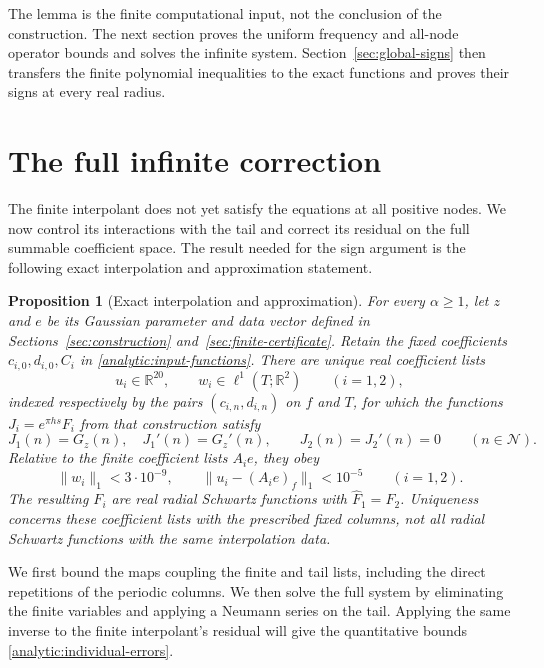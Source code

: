 \documentclass[11pt]{article}
\newtheorem{proposition}[theorem]{Proposition}
\theoremstyle{remark}\newtheorem{remark}[theorem]{Remark}
\begin{document}
The lemma is the finite computational input, not the conclusion of the
construction. The next section proves the uniform frequency and all-node
operator bounds and solves the infinite system. Section~\ref{sec:global-signs}
then transfers the finite polynomial inequalities to the exact functions
and proves their signs at every real radius.


\section{The full infinite correction}\label{sec:infinite}

The finite interpolant does not yet satisfy the equations at all positive
nodes. We now control its interactions with the tail and correct its
residual on the full summable coefficient space. The result needed for
the sign argument is the following exact interpolation and approximation
statement.

\begin{proposition}[Exact interpolation and approximation]
\label{prop:exact-interpolation}
For every $\alpha\ge1$, let $z$ and $e$ be its Gaussian parameter and
data vector defined in Sections~\ref{sec:construction}
and~\ref{sec:finite-certificate}. Retain the fixed coefficients
$c_{i,0},d_{i,0},C_i$ in \eqref{analytic:input-functions}.
There are unique real coefficient lists
\[
 u_i\in\mathbb R^{20},\qquad
 w_i\in\ell^1(T;\mathbb R^2)\qquad(i=1,2),
\]
indexed respectively by the pairs $(c_{i,n},d_{i,n})$ on $f$ and $T$,
for which the functions $J_i=e^{\pi hs}F_i$ from that construction
satisfy
\[
 J_1(n)=G_z(n),\quad J_1'(n)=G_z'(n),\qquad
 J_2(n)=J_2'(n)=0\qquad(n\in\mathcal N).
\]
Relative to the finite coefficient lists $A_i e$, they obey
\begin{equation}
 \|w_i\|_1<3\cdot10^{-9},\qquad
 \|u_i-(A_i e)_f\|_1<10^{-5}\qquad(i=1,2).
 \label{analytic:individual-errors}
\end{equation}
The resulting $F_i$ are real radial Schwartz functions with
$\widehat F_1=F_2$. Uniqueness concerns these coefficient lists with
the prescribed fixed columns, not all radial Schwartz functions with
the same interpolation data.
\end{proposition}

We first bound the maps coupling the finite and tail lists, including
the direct repetitions of the periodic columns. We then solve the full
system by eliminating the finite variables and applying a Neumann
series on the tail. Applying the same inverse to the finite interpolant's
residual will give the quantitative bounds
\eqref{analytic:individual-errors}.
\end{document}
